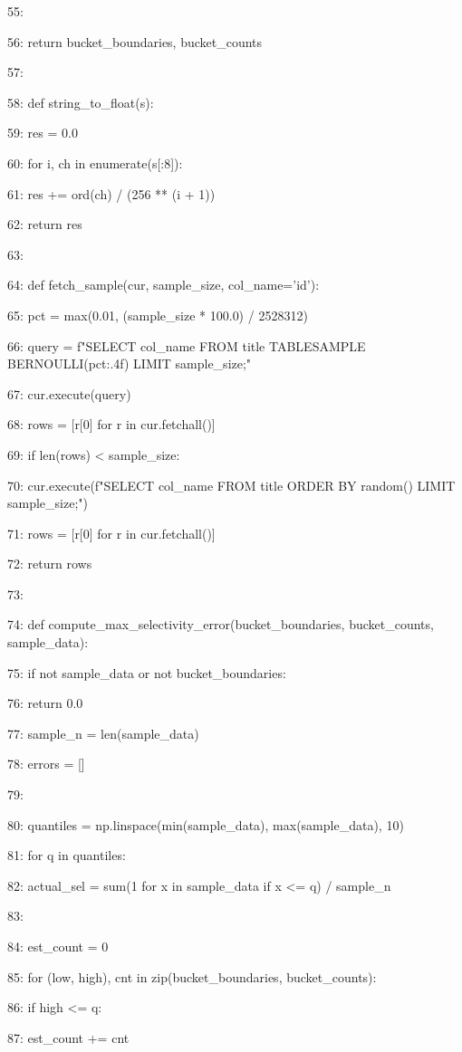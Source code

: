\documentclass[11pt,a4paper]{article}
\begin{document}
{{{55:

56:     return bucket\_boundaries, bucket\_counts

57:

58: def string\_to\_float(s):

59:     res = 0.0

60:     for i, ch in enumerate(s[:8]):

61:         res += ord(ch) / (256 ** (i + 1))

62:     return res

63:

64: def fetch\_sample(cur, sample\_size, col\_name='id'):

65:     pct = max(0.01, (sample\_size * 100.0) / 2528312)

66:     query = f"SELECT {col\_name} FROM title TABLESAMPLE BERNOULLI({pct:.4f}) LIMIT {sample\_size};"

67:     cur.execute(query)

68:     rows = [r[0] for r in cur.fetchall()]

69:     if len(rows) < sample\_size:

70:         cur.execute(f"SELECT {col\_name} FROM title ORDER BY random() LIMIT {sample\_size};")

71:         rows = [r[0] for r in cur.fetchall()]

72:     return rows

73:

74: def compute\_max\_selectivity\_error(bucket\_boundaries, bucket\_counts, sample\_data):

75:     if not sample\_data or not bucket\_boundaries:

76:         return 0.0

77:     sample\_n = len(sample\_data)

78:     errors = []

79:

80:     quantiles = np.linspace(min(sample\_data), max(sample\_data), 10)

81:     for q in quantiles:

82:         actual\_sel = sum(1 for x in sample\_data if x <= q) / sample\_n

83:

84:         est\_count = 0

85:         for (low, high), cnt in zip(bucket\_boundaries, bucket\_counts):

86:             if high <= q:

87:                 est\_count += cnt

}}}
\end{document}
